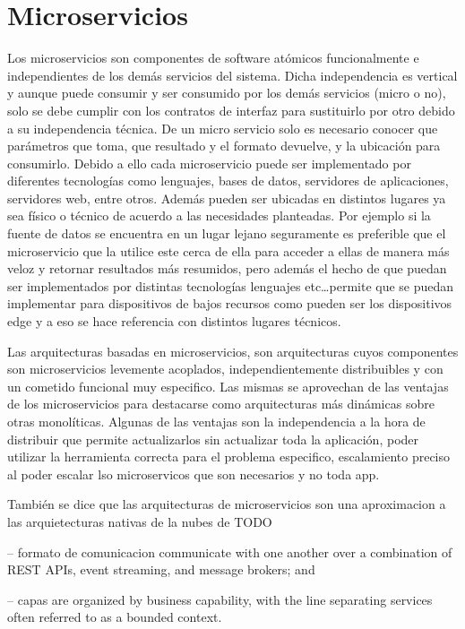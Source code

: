 \section{Microservicios}

Los microservicios son componentes de software atómicos funcionalmente e independientes de los demás servicios del sistema. Dicha independencia es vertical y aunque puede consumir y ser consumido por los demás servicios (micro o no), solo se debe cumplir con los contratos de interfaz para sustituirlo por otro debido a su independencia técnica. De un micro servicio solo es necesario conocer que parámetros que toma, que resultado y el formato devuelve, y la ubicación para consumirlo. Debido a ello cada microservicio puede ser implementado por diferentes tecnologías como lenguajes, bases de datos, servidores de aplicaciones, servidores web, entre otros. Además pueden ser ubicadas en distintos lugares ya sea físico o técnico de acuerdo a las necesidades planteadas. Por ejemplo si la fuente de datos se encuentra en un lugar lejano seguramente es preferible que el microservicio que la utilice este cerca de ella para acceder a ellas de manera más veloz y retornar resultados más resumidos, pero además el hecho de que puedan ser implementados por distintas tecnologías lenguajes etc\dots permite que se puedan implementar para dispositivos de bajos recursos como pueden ser los dispositivos edge y a eso se hace referencia con distintos lugares técnicos.

Las arquitecturas basadas en microservicios, son arquitecturas cuyos componentes son microservicios levemente acoplados, independientemente distribuibles y con un cometido funcional muy especifico. Las mismas se aprovechan de las ventajas de los microservicios para destacarse como arquitecturas más dinámicas sobre otras monolíticas.
Algunas de las ventajas son la independencia a la hora de distribuir que permite actualizarlos sin actualizar toda la aplicación, poder utilizar la herramienta correcta para el problema especifico, escalamiento preciso al poder escalar lso microservicos que son necesarios y no toda app.

También se dice que las arquitecturas de microservicios son una aproximacion a las arquietecturas nativas de la nubes de TODO


-- formato de comunicacion communicate with one another over a combination of REST APIs, event streaming, and message brokers; and

-- capas are organized by business capability, with the line separating services often referred to as a bounded context.

